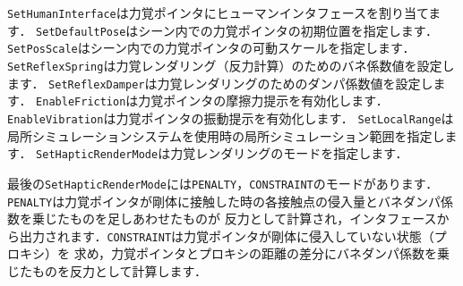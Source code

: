 \texttt{SetHumanInterface}\KLUDGE は力覚ポインタにヒューマンインタフェースを割り当てます．
\texttt{SetDefaultPose}\KLUDGE はシーン内での力覚ポインタの初期位置を指定します．
\texttt{SetPosScale}\KLUDGE はシーン内での力覚ポインタの可動スケールを指定します．
\texttt{SetReflexSpring}\KLUDGE は力覚レンダリング（反力計算）のためのバネ係数値を設定します．
\texttt{SetReflexDamper}\KLUDGE は力覚レンダリングのためのダンパ係数値を設定します．
\texttt{EnableFriction}\KLUDGE は力覚ポインタの摩擦力提示を有効化します．
\texttt{EnableVibration}\KLUDGE は力覚ポインタの振動提示を有効化します．
\texttt{SetLocalRange}\KLUDGE は局所シミュレーションシステムを使用時の局所シミュレーション範囲を指定します．
\texttt{SetHapticRenderMode}\KLUDGE は力覚レンダリングのモードを指定します．

\KLUDGE 最後の\texttt{SetHapticRenderMode}\KLUDGE には\texttt{PENALTY}\KLUDGE ，\texttt{CONSTRAINT}\KLUDGE のモードがあります．
\texttt{PENALTY}\KLUDGE は力覚ポインタが剛体に接触した時の各接触点の侵入量とバネダンパ係数を乗じたものを足しあわせたものが
\KLUDGE 反力として計算され，インタフェースから出力されます．\texttt{CONSTRAINT}\KLUDGE は力覚ポインタが剛体に侵入していない状態（プロキシ）を
\KLUDGE 求め，力覚ポインタとプロキシの距離の差分にバネダンパ係数を乗じたものを反力として計算します．
